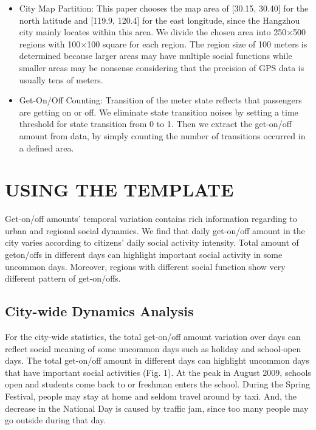 \documentclass[a4paper, 10pt, conference]{ieeeconf}      %
\begin{document}
\begin{itemize}

\item City Map Partition: This paper chooses the map area of [30.15, 30.40] for the north latitude and [119.9, 120.4] for the east longitude, since the Hangzhou city mainly locates within this area. We divide the chosen area into 250×500 regions with 100×100 square for each region. The region size of 100 meters is determined because larger areas may have multiple social functions while smaller areas may be nonsense considering that the precision of GPS data is usually tens of meters.
\item Get-On/Off Counting: Transition of the meter state reflects that passengers are getting on or off. We eliminate state transition noises by setting a time threshold for state transition from 0 to 1. Then we extract the get-on/off amount from data, by simply counting the number of transitions occurred in a defined area.

\end{itemize}

\section{USING THE TEMPLATE}%

Get-on/off amounts’ temporal variation contains rich information regarding to urban and regional social dynamics. We find that daily get-on/off amount in the city varies according to citizens’ daily social activity intensity. Total amount of geton/offs in different days can highlight important social activity in some uncommon days. Moreover, regions with different social function show very different pattern of get-on/offs.

\subsection{City-wide Dynamics Analysis} For the city-wide statistics, the total get-on/off amount variation over days can reflect social meaning of some uncommon days such as holiday and school-open days.
The total get-on/off amount in different days can highlight uncommon days that have important social activities (Fig. 1). At the peak in August 2009, schools open and students come back to or freshman enters the school. During the Spring Festival, people may stay at home and seldom travel around by taxi. And, the decrease in the National Day is caused by traffic jam, since too many people may go outside during that day.
\end{document}
